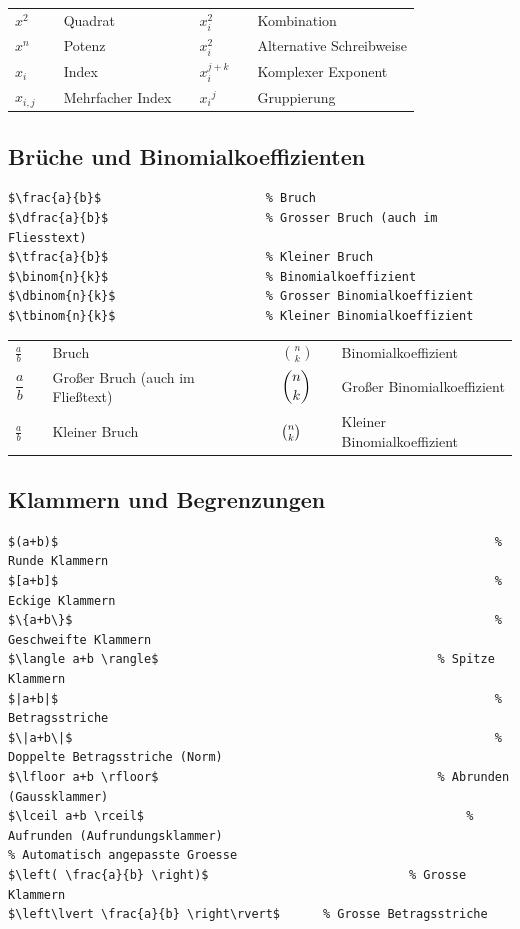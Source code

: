 \documentclass[12pt,a4paper]{article}
\begin{document}
\begin{ausgabe}
\begin{tabular}{l c l c l c l}
	$x^2$ & & Quadrat & \hspace{1cm} & $x^2_i$ & & Kombination\\
	$x^n$ & & Potenz & & $x_i^2$ & & Alternative Schreibweise\\
	$x_i$ & & Index & & $x_i^{j+k}$ & & Komplexer Exponent\\
	$x_{i,j}$ & & Mehrfacher Index & & ${x_i}^j$ & & Gruppierung
\end{tabular}
\end{ausgabe}



\subsection{Brüche und Binomialkoeffizienten}

\begin{lstlisting}[style=latex]
$\frac{a}{b}$   				 	% Bruch
$\dfrac{a}{b}$   					% Grosser Bruch (auch im Fliesstext)
$\tfrac{a}{b}$   					% Kleiner Bruch
$\binom{n}{k}$   					% Binomialkoeffizient
$\dbinom{n}{k}$  					% Grosser Binomialkoeffizient
$\tbinom{n}{k}$  					% Kleiner Binomialkoeffizient
\end{lstlisting}

\begin{ausgabe}
\begin{tabular}{l c l c l c l}
	\vspace{0.25cm}
	$\frac{a}{b}$ & & Bruch & & $\binom{n}{k}$ & & Binomialkoeffizient\\
	\vspace{0.25cm}
	$\dfrac{a}{b}$ & & Großer Bruch (auch im Fließtext) & & $\dbinom{n}{k}$ & & Großer Binomialkoeffizient\\
	$\tfrac{a}{b}$ & & Kleiner Bruch & & $\tbinom{n}{k}$ & & Kleiner Binomialkoeffizient
\end{tabular}
\end{ausgabe}



\subsection{Klammern und Begrenzungen}

\begin{lstlisting}[style=latex]
$(a+b)$          													% Runde Klammern
$[a+b]$          													% Eckige Klammern			
$\{a+b\}$        													% Geschweifte Klammern
$\langle a+b \rangle$ 										% Spitze Klammern
$|a+b|$          													% Betragsstriche
$\|a+b\|$        													% Doppelte Betragsstriche (Norm)
$\lfloor a+b \rfloor$ 										% Abrunden (Gaussklammer)
$\lceil a+b \rceil$ 											% Aufrunden (Aufrundungsklammer)
% Automatisch angepasste Groesse
$\left( \frac{a}{b} \right)$ 							% Grosse Klammern
$\left\lvert \frac{a}{b} \right\rvert$ 		% Grosse Betragsstriche
\end{lstlisting}
\end{document}
